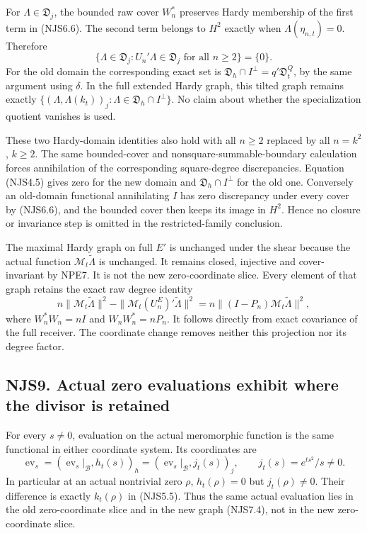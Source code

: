 For \(\Lambda\in\mathfrak D_j\), the bounded raw cover \(W_n^*\)
preserves Hardy membership of the first term in (NJS6.6). The second
term belongs to \(H^2\) exactly when \(\Lambda(\eta_{n,t})=0\).
Therefore \[
\{\Lambda\in\mathfrak D_j:U_n'\Lambda\in\mathfrak D_j\text{ for all }n\ge2\}
=\{0\}.
\tag{NJS8.3}
\] For the old domain the corresponding exact set is
\(\mathfrak D_h\cap I^\perp=q'\mathfrak D_t^Q\), by the same argument
using \(\delta\). In the full extended Hardy graph, this tilted graph
remains exactly
\(\{(\Lambda,\Lambda(k_t))_j:\Lambda\in\mathfrak D_h\cap I^\perp\}\). No
claim about whether the specialization quotient vanishes is used.

These two Hardy-domain identities also hold with all \(n\ge2\) replaced
by all \(n=k^2\), \(k\ge2\). The same bounded-cover and
nonsquare-summable-boundary calculation forces annihilation of the
corresponding square-degree discrepancies. Equation (NJS4.5) gives zero
for the new domain and \(\mathfrak D_h\cap I^\perp\) for the old one.
Conversely an old-domain functional annihilating \(I\) has zero
discrepancy under every cover by (NJS6.6), and the bounded cover then
keeps its image in \(H^2\). Hence no closure or invariance step is
omitted in the restricted-family conclusion.

The maximal Hardy graph on full \(E'\) is unchanged under the shear
because the actual function \(\mathcal M_t\widetilde\Lambda\) is
unchanged. It remains closed, injective and cover-invariant by NPE7. It
is not the new zero-coordinate slice. Every element of that graph
retains the exact raw degree identity \[
n\|\mathcal M_t\widetilde\Lambda\|^2
-\|\mathcal M_t(U_n^E)'\widetilde\Lambda\|^2
=n\|(I-P_n)\mathcal M_t\widetilde\Lambda\|^2,
\tag{NJS8.4}
\] where \(W_n^*W_n=nI\) and \(W_nW_n^*=nP_n\). It follows directly from
exact covariance of the full receiver. The coordinate change removes
neither this projection nor its degree factor.

\subsection{NJS9. Actual zero evaluations exhibit where the divisor is
retained}\label{njs9.-actual-zero-evaluations-exhibit-where-the-divisor-is-retained}

For every \(s\ne0\), evaluation on the actual meromorphic function is
the same functional in either coordinate system. Its coordinates are \[
\operatorname{ev}_s=(\operatorname{ev}_s|_{\mathcal B},h_t(s))_h
=(\operatorname{ev}_s|_{\mathcal B},j_t(s))_j,
\qquad j_t(s)=e^{ts^2}/s\ne0.
\tag{NJS9.1}
\] In particular at an actual nontrivial zero \(\rho\), \(h_t(\rho)=0\)
but \(j_t(\rho)\ne0\). Their difference is exactly \(k_t(\rho)\) in
(NJS5.5). Thus the same actual evaluation lies in the old
zero-coordinate slice and in the new graph (NJS7.4), not in the new
zero-coordinate slice.

